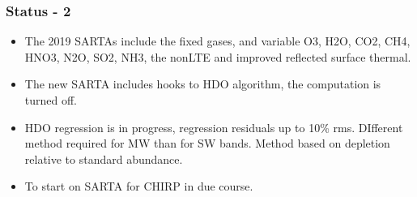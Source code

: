 \documentclass[10pt,t]{beamer}
\begin{document}
\begin{frame}
  \frametitle{Status - 2}
  \begin{itemize}
  \item The 2019 SARTAs include the fixed gases, and variable O3, H2O, CO2, CH4, HNO3, N2O, SO2, NH3, the nonLTE and improved reflected surface thermal. 
  \item The new SARTA includes hooks to HDO algorithm, the computation is turned off.
  \item HDO regression is in progress, regression residuals up to 10\% rms. DIfferent method required for MW than for SW bands. Method based on depletion relative to standard abundance.
  \item To start on SARTA for CHIRP in due course.
    
  \end{itemize}
\end{frame}

    

    
\end{document}
